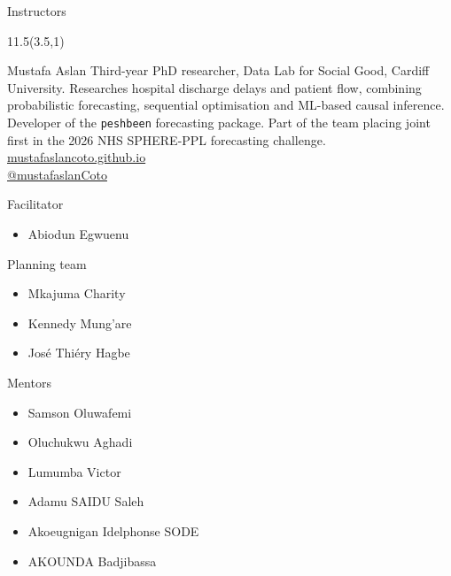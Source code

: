 \documentclass[
  14pt,
  ignorenonframetext,
  aspectratio=169,
]{beamer}
\providecommand{\tightlist}{%
  \setlength{\itemsep}{0pt}\setlength{\parskip}{0pt}}
\begin{document}
\begin{frame}{Instructors}
\protect{}\label{instructors-1}
\begin{textblock}{11.5}(3.5,1)
  \begin{alertblock}{Mustafa Aslan}
    {\footnotesize Third-year PhD researcher, Data Lab for Social Good, Cardiff University. Researches hospital discharge delays and patient flow, combining probabilistic forecasting, sequential optimisation and ML-based causal inference. Developer of the \texttt{peshbeen} forecasting package. Part of the team placing joint first in the 2026 NHS SPHERE-PPL forecasting challenge.\\
      \href{https://mustafaslancoto.github.io/}{ mustafaslancoto.github.io}\\
      \href{https://github.com/mustafaslanCoto}{ @mustafaslanCoto}
    }
  \end{alertblock}
\end{textblock}
\end{frame}

\begin{frame}{Facilitator}
\protect{}\label{facilitator}
\begin{itemize}
\tightlist
\item
  Abiodun Egwuenu
\end{itemize}
\end{frame}

\begin{frame}{Planning team}
\protect{}\label{planning-team}
\begin{itemize}
\tightlist
\item
  Mkajuma Charity
\item
  Kennedy Mung'are
\item
  José Thiéry Hagbe
\end{itemize}
\end{frame}

\begin{frame}{Mentors}
\protect{}\label{mentors}
\begin{itemize}
\tightlist
\item
  Samson Oluwafemi
\item
  Oluchukwu Aghadi
\item
  Lumumba Victor
\item
  Adamu SAIDU Saleh
\item
  Akoeugnigan Idelphonse SODE
\item
  AKOUNDA Badjibassa
\end{itemize}
\end{frame}
\end{document}
